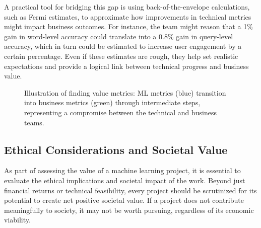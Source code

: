 \documentclass[12pt,openany]{book}
\begin{document}
A practical tool for bridging this gap is using back-of-the-envelope calculations, such as Fermi estimates, to approximate how improvements in technical metrics might impact business outcomes. For instance, the team might reason that a 1\% gain in word-level accuracy could translate into a 0.8\% gain in query-level accuracy, which in turn could be estimated to increase user engagement by a certain percentage. Even if these estimates are rough, they help set realistic expectations and provide a logical link between technical progress and business value.

\begin{figure}[H]
    \centering
    \caption{Illustration of finding value metrics: ML metrics (blue) transition into business metrics (green) through intermediate steps, representing a compromise between the technical and business teams.}
    \label{fig:value_metrics}
\end{figure}


\subsection{Ethical Considerations and Societal Value}

As part of assessing the value of a machine learning project, it is essential to evaluate the ethical implications and societal impact of the work. Beyond just financial returns or technical feasibility, every project should be scrutinized for its potential to create net positive societal value. If a project does not contribute meaningfully to society, it may not be worth pursuing, regardless of its economic viability. \newline
\end{document}
